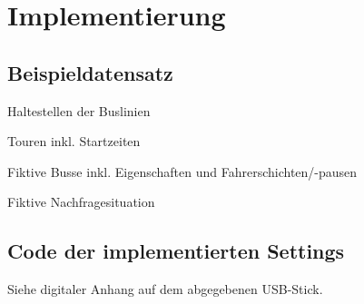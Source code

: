 \chapter{Implementierung}
\section{Beispieldatensatz}\label{sec:dataset}

\begin{table}[htbp]
    \centering
    \begin{minipage}{0.5\textwidth}
      \centering
      \caption{Haltestellen der Buslinien}\label{tab:buslines}
    \end{minipage}\hfill
    \begin{minipage}{0.5\textwidth}
      \centering
      \caption{Touren inkl. Startzeiten}\label{tab:lines}
    \end{minipage}
\end{table}
\begin{table}
    \centering
    \caption{Fiktive Busse inkl. Eigenschaften und Fahrerschichten/-pausen}\label{tab:busses}
\end{table}  
\begin{table}
      \centering
      \caption{Fiktive Nachfragesituation}\label{tab:demand}
\end{table}

\section{Code der implementierten Settings}

Siehe digitaler Anhang auf dem abgegebenen USB-Stick.